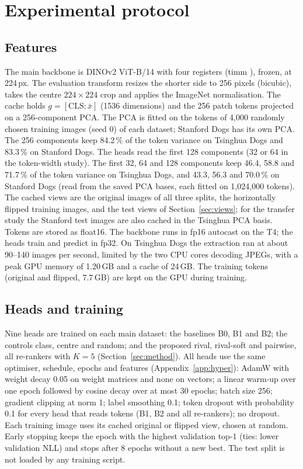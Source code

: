 \documentclass[11pt,a4paper]{article}
\theoremstyle{plain}
\newcommand{\fn}[1]{\texttt{\detokenize{#1}}}
\begin{document}
\section{Experimental protocol}\label{sec:protocol}

\subsection{Features}\label{sec:features}
The main backbone is DINOv2 ViT-B/14 with four registers (timm \fn{vit_base_patch14_reg4_}\allowbreak\fn{dinov2.lvd142m}), frozen,
at 224\,px. The evaluation transform resizes the shorter side to 256 pixels (bicubic), takes the centre
$224\times224$ crop and applies the ImageNet normalisation. The cache holds $g=[\mathrm{CLS};\bar x]$ (1536
dimensions) and the 256 patch tokens projected on a 256-component PCA. The PCA is fitted on the tokens of 4,000
randomly chosen training images (seed 0) of each dataset; Stanford Dogs has its own PCA. The 256 components keep
84.2\,\% of the token variance on Tsinghua Dogs and 83.3\,\% on Stanford Dogs. The heads read the first 128
components (32 or 64 in the token-width study). The first 32, 64 and 128 components keep 46.4, 58.8 and 71.7\,\% of
the token variance on Tsinghua Dogs, and 43.3, 56.3 and 70.0\,\% on Stanford Dogs (read from the saved PCA bases,
each fitted on 1,024,000 tokens).
The cached views are the original images of all three splits, the horizontally flipped training images, and the test
views of Section~\ref{sec:views}; for the transfer study the Stanford test images are also cached in the Tsinghua PCA
basis. Tokens are stored as float16. The backbone runs in fp16 autocast on the T4; the heads train and predict in
fp32. On Tsinghua Dogs the extraction ran at about 90--140 images per second, limited by the two CPU cores decoding
JPEGs, with a peak GPU memory of 1.20\,GB and a cache of 24\,GB. The training tokens (original and flipped, 7.7\,GB)
are kept on the GPU during training.

\subsection{Heads and training}\label{sec:training}
Nine heads are trained on each main dataset: the baselines B0, B1 and B2; the controls class, centre and random; and
the proposed rival, rival-soft and pairwise, all re-rankers with $K=5$ (Section~\ref{sec:method}). All heads use the
same optimiser, schedule, epochs and features (Appendix~\ref{app:hyper}): AdamW with weight decay 0.05 on weight
matrices and none on vectors; a linear warm-up over one epoch followed by cosine decay over at most 30 epochs; batch
size 256; gradient clipping at norm 1; label smoothing 0.1; token dropout with probability 0.1 for every head that
reads tokens (B1, B2 and all re-rankers); no dropout. Each training image uses its cached original or flipped view, chosen at random. Early stopping keeps the
epoch with the highest validation top-1 (ties: lower validation NLL) and stops after 8 epochs without a new best. The
test split is not loaded by any training script.
\end{document}
